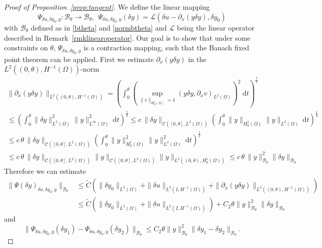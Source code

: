\begin{proof}[Proof of Proposition~\ref{prop:tangent}]
We define the linear mapping
\[
\Psi_{\delta u, \delta y_0,y}\colon \mathcal B_{\theta}\rightarrow \mathcal B_{\theta},~~\Psi_{\delta u, \delta y_0,y}(\delta y) = \mathcal{L}(\delta u - \partial_x(y\delta y),\delta y_0)
\]
with $\mathcal B_{\theta}$ defined as in \eqref{btheta} and \eqref{normbtheta} and $\mathcal{L}$ being the linear \KdV operator described in Remark~\ref{rmklinearoperator}. Our goal is to show that under some constraints on $\theta$, $\Psi_{\delta u, \delta y_0,y}$ is a contraction mapping, such that the Banach fixed point theorem can be applied. First we estimate $\partial_x(y \delta y)$ in the $L^2((0,\theta),H^{-1}(\Omega))$-norm
\begin{multline}\label{estimate_variable_coefficient}
\|\partial_x(y\delta y)\|_{L^2((0,\theta),H^{-1}(\Omega))}=\left(\int_{0}^{\theta}\left(\underset{\|v\|_{H^1_0(\Omega)}=1}{\operatorname{sup}}(y\delta y,\partial_x v)_{L^2(\Omega)}\right)^2~\mathrm dt\right)^{\frac{1}{2}}\\
\leq\left(\int_{0}^{\theta}\|\delta y\|_{L^2(\Omega)}^2\|y\|_{L^\infty(\Omega)}^2~\mathrm dt\right)^{\frac{1}{2}}\leq c\,\|\delta y\|_{\mathcal C([0,\theta],L^2(\Omega))}\left(\int_{0}^{\theta}\|y\|_{H^1_0(\Omega)}\|y\|_{L^2(\Omega)}~\mathrm dt\right)^{\frac{1}{2}}\\
\leq c\,\theta\,\|\delta y\|_{\mathcal C([0,\theta],L^2(\Omega))}\left(\int_{0}^{\theta}\|y\|_{H^1_0(\Omega)}^2\|y\|_{L^2(\Omega)}^2~\mathrm dt\right)^{\frac{1}{2}}\\
\leq c\,\theta\,\|\delta y\|_{\mathcal C([0,\theta],L^2(\Omega))}\|y\|_{\mathcal C([0,\theta],L^2(\Omega))}\|y\|_{L^2((0,\theta),H^1_0(\Omega))}\leq c\,\theta\,\|y\|_{\mathcal B_{\theta}}^2\|\delta y\|_{\mathcal B_{\theta}}
\end{multline}
Therefore we can estimate
\begin{align*}
\|\Psi(\delta y)_{\delta u, \delta y_0,y}\|_{\mathcal B_{\theta}} & \leq \widetilde{C}\left(\|\delta y_0\|_{L^2(\Omega)}+\|\delta u\|_{L^2(I,H^{-1}(\Omega))}+\|\partial_x(y\delta y)\|_{L^2((0,\theta),H^{-1}(\Omega))}\right)\\
&\leq \widetilde{C}\left(\|\delta y_0\|_{L^2(\Omega)}+\|\delta u\|_{L^2(I,H^{-1}(\Omega))}\right) + C_2\theta\|y\|_{\mathcal B_{\theta}}^2\|\delta y\|_{\mathcal B_{\theta}}
\end{align*}
and
\[
\|\Psi_{\delta u, \delta y_0,y}(\delta y_1)-\Psi_{\delta u, \delta y_0,y}(\delta y_2)\|_{\mathcal B_{\theta}}\leq C_2\theta\|y\|_{\mathcal B_{\theta}}^2\|\delta y_1-\delta y_2\|_{\mathcal B_{\theta}}.
\]
\end{proof}

